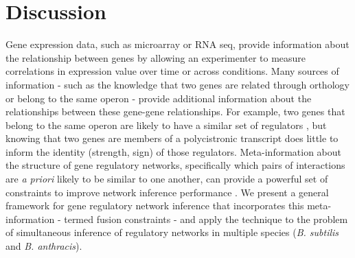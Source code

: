 \documentclass[11pt]{article}
\begin{document}
\section{Discussion}
Gene expression data, such as microarray or RNA seq, provide information about the relationship between genes by allowing an experimenter to measure correlations in expression value over time or across conditions. Many sources of information - such as the knowledge that two genes are related through orthology or belong to the same operon - provide additional information about the relationships between these gene-gene relationships. 
For example,  two genes that belong to the same operon are likely to have a similar set of regulators \cite{lawrence_shared_2002}, but knowing that two genes are members of a polycistronic transcript does little to inform the identity (strength, sign) of those regulators. 
Meta-information about the structure of gene regulatory networks, specifically which pairs of interactions are \textit{a priori} likely to be similar to one another, can provide a powerful set of constraints to improve network inference performance \cite{roy_arboretum:_2013, pierson_sharing_2015}. 
We present a general framework for gene regulatory network inference that incorporates this meta-information - termed fusion constraints - and apply the technique to the problem of simultaneous inference of regulatory networks in multiple species (\textit{B. subtilis} and \textit{B. anthracis}). 
\end{document}
